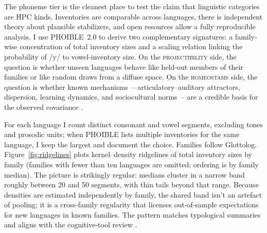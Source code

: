 \documentclass[12pt]{article}
\begin{document}
The phoneme tier is the cleanest place to test the claim that linguistic categories are HPC kinds. Inventories are comparable across languages, there is independent theory about plausible stabilizers, and open resources allow a fully reproducible analysis. I use PHOIBLE~2.0 \citep{MoranEtAl2019PHOIBLE} to derive two complementary signatures: a family‐wise concentration of total inventory sizes and a scaling relation linking the probability of /y/ to vowel‐inventory size. On the \textsc{projectibility} side, the question is whether unseen languages behave like held‐out members of their families or like random draws from a diffuse space. On the \textsc{homeostasis} side, the question is whether known mechanisms~-- articulatory–auditory attractors, dispersion, learning dynamics, and sociocultural norms~-- are a credible basis for the observed covariance \citep{Stevens1989Quantal,LiljencrantsLindblom1972,Lindblom1990HandH,Ekstrom2025PhonemeTool}.

For each language I count distinct consonant and vowel segments, excluding tones and prosodic units; when PHOIBLE lists multiple inventories for the same language, I keep the largest and document the choice. Families follow Glottolog. Figure~\ref{fig:ridgelines} plots kernel–density ridgelines of total inventory sizes by family (families with fewer than ten languages are omitted; ordering is by family median). The picture is strikingly regular: medians cluster in a narrow band roughly between 20 and 50 segments, with thin tails beyond that range. Because densities are estimated independently by family, the shared band isn't an artefact of pooling; it is a cross‐family regularity that licenses out‐of‐sample expectations for new languages in known families. The pattern matches typological summaries and aligns with the cognitive-tool review \citep[Fig.\,1]{Ekstrom2025PhonemeTool}.
\end{document}
